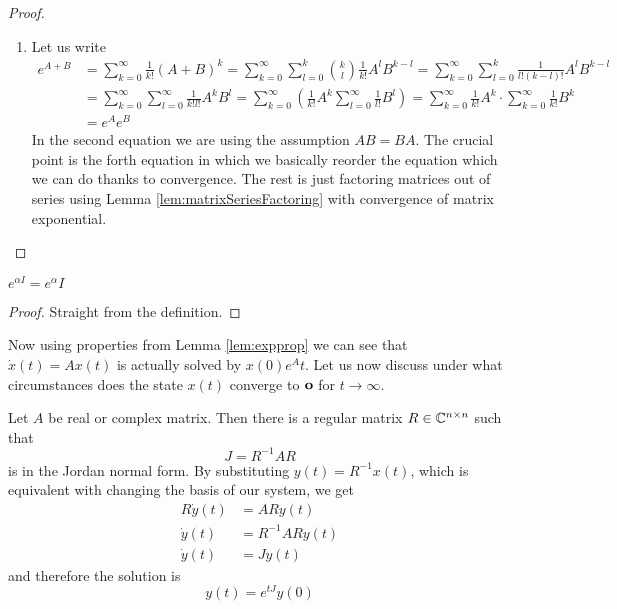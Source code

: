 \begin{proof}
\begin{enumerate}
		\item Let us write 
		\begin{align*}
			e^{A+B}
			&=\sum^\infty_{k=0}\frac{1}{k!}(A+B)^{k}
			=\sum^\infty_{k=0}\sum^k_{l=0}\binom{k}{l}\frac{1}{k!}A^{l}B^{k-l}
			=\sum^\infty_{k=0}\sum^k_{l=0}\frac{1}{l!(k-l)!}A^{l}B^{k-l}
			\\
			&=\sum^\infty_{k=0}\sum^\infty_{l=0}\frac{1}{k!l!}A^kB^l
			=\sum^\infty_{k=0}\left(\frac{1}{k!}A^k\sum^\infty_{l=0}\frac{1}{l!}B^l\right)
			=\sum^\infty_{k=0}\frac{1}{k!}A^{k}\cdot\sum^\infty_{k=0}\frac{1}{k!}B^{k}
			\\
			&=e^{A}e^B
		\end{align*}
		In the second equation we are using the assumption $AB=BA$. The crucial point is the forth equation in which we basically reorder the equation which we can do thanks to convergence. The rest is just factoring matrices out of series using Lemma \ref{lem:matrixSeriesFactoring} with convergence of matrix exponential.
	\end{enumerate}
\end{proof}

\begin{remark}
	$e^{\alpha I}=e^{\alpha}I$
\end{remark}

\begin{proof}
	Straight from the definition.
\end{proof}

Now using properties from Lemma \ref{lem:expprop} we can see that $\dot{x}(t)=Ax(t)$ is actually solved by $x(0)e^At$. Let us now discuss under what circumstances does the state $x(t)$ converge to $\textbf{o}$ for $t\rightarrow\infty$. 

Let $A$ be real or complex matrix. Then there is a regular matrix $R\in \mathbb{C}^{n\times n}$ such that $$J=R^{-1}AR$$ is in the Jordan normal form. By substituting $y(t)=R^{-1}x(t)$, which is equivalent with changing the basis of our system, we get 
\begin{align*}
	R\dot{y}(t)&=ARy(t) \\
	\dot{y}(t)&=R^{-1}ARy(t) \\
	\dot{y}(t)&=Jy(t)
\end{align*}
 and therefore the solution is $$y(t)=e^{tJ}y(0)$$ 


